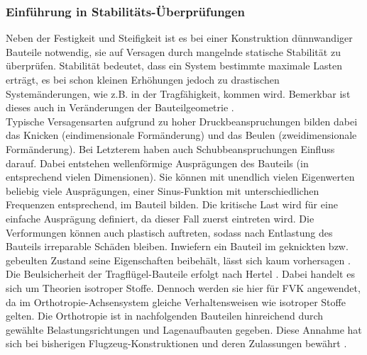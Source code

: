 \subsubsection{Einführung in Stabilitäts-Überprüfungen}
Neben der Festigkeit und Steifigkeit ist es bei einer Konstruktion dünnwandiger Bauteile notwendig, sie auf Versagen durch mangelnde statische Stabilität zu überprüfen. Stabilität bedeutet, dass ein System bestimmte maximale Lasten erträgt, es bei schon kleinen Erhöhungen jedoch zu drastischen Systemänderungen, wie z.B. in der Tragfähigkeit, kommen wird. Bemerkbar ist dieses auch in Veränderungen der Bauteilgeometrie \cite{item16}.\\

\noindent Typische Versagensarten aufgrund zu hoher Druckbeanspruchungen bilden dabei das Knicken (eindimensionale Formänderung) und das Beulen (zweidimensionale Formänderung). Bei Letzterem haben auch Schubbeanspruchungen Einfluss darauf. Dabei entstehen wellenförmige Ausprägungen des Bauteils (in entsprechend vielen Dimensionen). Sie können mit unendlich vielen Eigenwerten beliebig viele Ausprägungen, einer Sinus-Funktion mit unterschiedlichen Frequenzen entsprechend, im Bauteil bilden. Die kritische Last wird für eine einfache Ausprägung definiert, da dieser Fall zuerst eintreten wird. Die Verformungen können auch plastisch auftreten, sodass nach Entlastung des Bauteils irreparable Schäden bleiben. Inwiefern ein Bauteil im geknickten bzw. gebeulten Zustand seine Eigenschaften beibehält, lässt sich kaum vorhersagen \cite{item16}.\\

\noindent Die Beulsicherheit der Tragflügel-Bauteile erfolgt nach Hertel \cite{item1}. Dabei handelt es sich um Theorien isotroper Stoffe. Dennoch werden sie hier für FVK angewendet, da im Orthotropie-Achsensystem gleiche Verhaltensweisen wie isotroper Stoffe gelten. Die Orthotropie ist in nachfolgenden Bauteilen hinreichend durch gewählte Belastungsrichtungen und Lagenaufbauten gegeben. Diese Annahme hat sich bei bisherigen Flugzeug-Konstruktionen und deren Zulassungen bewährt \cite{item21}.\\

